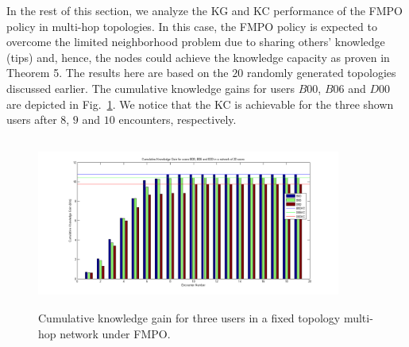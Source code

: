 \documentclass[conference]{IEEEtran}
\theoremstyle{definition}
\begin{document}
In the rest of this section, we analyze the KG and KC performance of the FMPO policy in multi-hop topologies. In this case, the FMPO policy is expected to overcome the limited neighborhood problem due to sharing others' knowledge (tips) and, hence, the nodes could achieve the knowledge capacity as proven in Theorem 5. The results here are based on the $20$ randomly generated topologies discussed earlier.  
The cumulative knowledge gains for users $B00$, $B06$ and $D00$ are depicted in Fig.~\ref{fig:B00_SMHOP_MO)}. We notice that the KC is achievable for the three shown users after $8$, $9$ and $10$ encounters, respectively.
%
  \begin{figure}[!bp]
	\centering
     \includegraphics[width=10cm ,height=5.6cm]{figures_png/Fig8}
    \caption{Cumulative knowledge gain for three users in a fixed topology multi-hop network under FMPO.}\label{fig:B00_SMHOP_MO)}
\end{figure}
%
\vspace{-0.6 cm}
\end{document}

